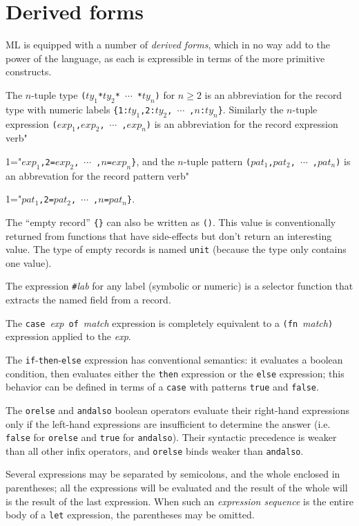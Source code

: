 \chapter{Derived forms}
\label{derived}
ML is equipped with a number of {\em derived forms}, which in no way
add to the power of the language, as each is expressible in terms of
the more primitive constructs.

The $n$-tuple type 
\verb"("$ty_1$\verb"*"$ty_2$\verb"*"~$\cdots$~\verb"*"$ty_n$\verb")"
for $n\geq 2$ is an abbreviation for the record type with numeric labels
\verb"{1:"$ty_1$\verb",2:"$ty_2$\verb","~$\cdots$~\verb","$n$\verb":"$ty_n$\verb"}".
Similarly the $n$-tuple expression 
\verb"("$exp_1$\verb","$exp_2$\verb","~$\cdots$~\verb","$exp_n$\verb")"
is an abbreviation for the record expression 
verb"{1="$exp_1$\verb",2="$exp_2$\verb","~$\cdots$~\verb","$n$\verb"="$exp_n$\verb"}",
and the $n$-tuple pattern
\verb"("$pat_1$\verb","$pat_2$\verb","~$\cdots$~\verb","$pat_n$\verb")"
is an abbrevation for the record pattern 
verb"{1="$pat_1$\verb",2="$pat_2$\verb","~$\cdots$~\verb","$n$\verb"="$pat_n$\verb"}".

The ``empty record'' \verb"{}" can also be written as \verb"()".  This
value is conventionally returned from functions that have side-effects
but don't return an interesting value.  The type of empty records
is named \verb"unit" (because the type only contains one value).

The expression \verb"#"{\it lab}  for any label (symbolic or numeric)
is a selector function that extracts the named field from a record.

The \verb"case"~{\it exp}~\verb"of"~{\it match} expression is completely
equivalent to a \verb"(fn"~{\it match}\verb")" expression applied to
the {\it exp}.

The \verb"if"-\verb"then"-\verb"else" expression has conventional semantics:
it evaluates a boolean condition, then evaluates either the \verb"then"
expression or the \verb"else" expression; this behavior can be defined
in terms of a \verb"case" with patterns \verb"true" and \verb"false".

The \verb"orelse" and \verb"andalso" boolean operators evaluate their
right-hand expressions only if the left-hand expressions are insufficient
to determine the answer (i.e. \verb"false" for \verb"orelse" and \verb"true"
for \verb"andalso").  Their syntactic precedence is weaker than all other
infix operators, and \verb"orelse" binds weaker than \verb"andalso".

Several expressions may be separated by semicolons, and the whole enclosed
in parentheses;  all the expressions will be evaluated and the result
of the whole will is the result of the last expression.  When such an
{\it expression sequence} is the entire body of a \verb"let" expression,
the parentheses may be omitted.

}}
